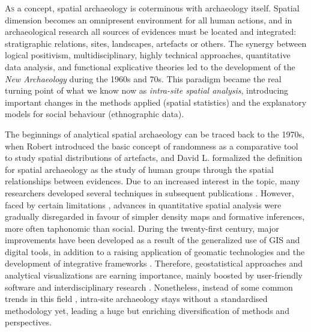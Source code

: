 \lettrine[lines=3,slope=4pt,findent=-3pt]{A}{s} a concept, spatial archaeology is coterminous with archaeology itself. Spatial dimension becomes an omnipresent environment for all human actions, and in archaeological research all sources of evidences must be located and integrated: stratigraphic relations, sites, landscapes, artefacts or others. The synergy between logical positivism, multidisciplinary, highly technical approaches, quantitative data analysis, and functional explicative theories led to the development of the \emph{New Archaeology} during the 1960s and 70s. This paradigm became the real turning point of what we know now as \emph{intra-site spatial analysis}, introducing important changes in the methods applied (spatial statistics) and the explanatory models for social behaviour (ethnographic data). 
	
The beginnings of analytical spatial archaeology can be traced back to the 1970s, when Robert \textcite{Whallon_1973} introduced the basic concept of randomness as a comparative tool to study spatial distributions of artefacts, and David L. \textcite{Clarke_1997} formalized the definition for spatial archaeology as the study of human groups through the spatial relationships between evidences. Due to an increased interest in the topic, many researchers developed several techniques in subsequent publications \parencites[e.g.][]{Hodder_1976}{Upham_1979}{Hietala_1984}{Blankholm_1991}. However, faced by certain limitations \parencite[cf.][]{Gamble_1991}, advances in quantitative spatial analysis were gradually disregarded in favour of simpler density maps and formative inferences, more often taphonomic than social. During the twenty-first century, major improvements have been developed as a result of the generalized use of GIS and digital tools, in addition to a raising application of geomatic technologies and the development of integrative frameworks \parencites{Llobera_2011}{McCoy_2009}. Therefore, geostatistical approaches and analytical visualizations are earning importance, mainly boosted by user-friendly software and interdisciplinary research \parencites[e.g.][]{Barceló_2008}{Craig_2006}{Lloyd_2004}{Katsianis_2008}. Nonetheless, instead of some common trends in this field \parencite[see][]{Djindjian_1999}, intra-site archaeology stays without a standardised methodology yet, leading a huge but enriching diversification of methods and perspectives. 
	
